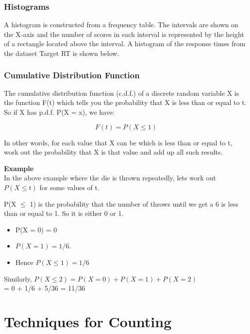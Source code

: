 \documentclass[IntroMain.tex]{subfiles}
\begin{document}
	\begin{frame}
		\frametitle{Histograms}
		A histogram is constructed from a frequency table. The intervals are shown on the X-axis and the number of scores in each interval is represented by the height of a rectangle located above the interval. A histogram of the response times from the dataset Target RT is shown below.
		
		
	\end{frame}
	\begin{frame}
		\frametitle{Cumulative Distribution Function}
		
		The cumulative distribution function (c.d.f.) of a discrete random variable X is the function F(t) which tells you the probability that X is less than or equal to t. So if X has p.d.f. P(X = x), we have:
		
		\[F(t) = P(X \leq 1)\] %
		
		In other words, for each value that X can be which is less than or equal to t, work out the probability that X is that value and add up all such results.
	\end{frame}
	\begin{frame}
		\textbf{Example}\\
		
		In the above example where the die is thrown repeatedly, lets work out $P(X \leq t)$ for some values of t.
		
		P(X $\leq$ 1) is the probability that the number of throws until we get a 6 is less than or equal to 1. So it is either 0 or 1. 
		
		\begin{itemize}
			\item P(X = 0) = 0 
			\item $P(X = 1) = 1/6$.
			\item  Hence $P(X \leq 1) = 1/6$
		\end{itemize}
		
		Similarly, $P(X \leq 2) = P(X = 0) + P(X = 1) + P(X = 2)$\\ = 0 + 1/6 + 5/36 = 11/36
		
	\end{frame}
	
	\section{Techniques for Counting}
	
\end{document}
